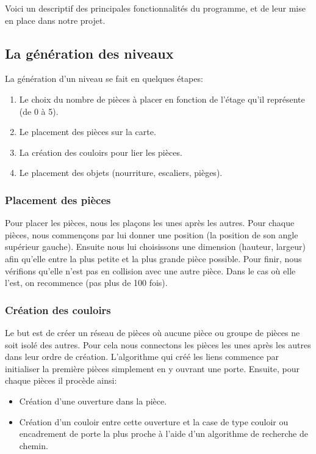 \documentclass[11pt]{report}
\begin{document}
	Voici un descriptif des principales fonctionnalités du programme, et de leur mise en place dans notre projet.
	
		\subsection{La génération des niveaux}
		
		La génération d'un niveau se fait en quelques étapes:
		\begin{enumerate}
			\item Le choix du nombre de pièces à placer en fonction de l'étage qu'il représente (de 0 à 5).
			\item Le placement des pièces sur la carte.
			\item La création des couloirs pour lier les pièces.
			\item Le placement des objets (nourriture, escaliers, pièges).
		\end{enumerate}
		
			\subsubsection{Placement des pièces}
			
			Pour placer les pièces, nous les plaçons les unes après les autres. Pour chaque pièces, nous commençons par lui donner une position (la position de son angle supérieur gauche). Ensuite nous lui choisissons une dimension (hauteur, largeur) afin qu'elle entre la plus petite et la plus grande pièce possible.
			Pour finir, nous vérifions qu'elle n'est pas en collision avec une autre pièce.
			Dans le cas où elle l'est, on recommence (pas plus de 100 fois).
			
			\subsubsection{Création des couloirs}
			
			Le but est de créer un réseau de pièces où aucune pièce ou groupe de pièces ne soit isolé des autres.
			Pour cela nous connectons les pièces les unes après les autres dans leur ordre de création.
			L'algorithme qui créé les liens commence par initialiser la première pièces simplement en y ouvrant une porte.
			Ensuite, pour chaque pièces il procède ainsi:
			\begin{itemize}
				\item Création d'une ouverture dans la pièce.
				\item Création d'un couloir entre cette ouverture et la case de type couloir ou encadrement de porte la plus proche à l'aide d'un algorithme de recherche de chemin.
			\end{itemize}
		
\end{document}
